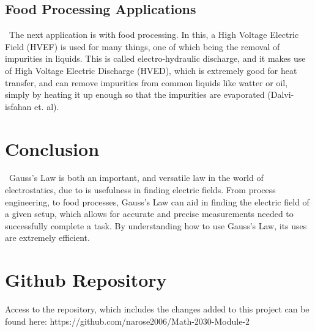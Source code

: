 \documentclass{report}
\begin{document}
\subsection{Food Processing Applications}
\ The next application is with food processing. In this, a High Voltage Electric Field (HVEF) is used for many things, one of which being the removal of impurities in liquids. This is called electro-hydraulic discharge, and it makes use of High Voltage Electric Discharge (HVED), which is extremely good for heat transfer, and can remove impurities from common liquids like watter or oil, simply by heating it up enough so that the impurities are evaporated (Dalvi-isfahan et. al). 

\section{Conclusion}
\ Gauss's Law is both an important, and versatile law in the world of electrostatics, due to is usefulness in finding electric fields. From process engineering, to food processes, Gauss's Law can aid in finding the electric field of a given setup, which allows for accurate and precise measurements needed to successfully complete a task. By understanding how to use Gauss's Law, its uses are extremely efficient.   

\section{Github Repository}
Access to the repository, which includes the changes added to this project can be found here: https://github.com/narose2006/Math-2030-Module-2



\cite{Gauss}
\cite{Overview}
\cite{FoodProcessing}
\end{document}
